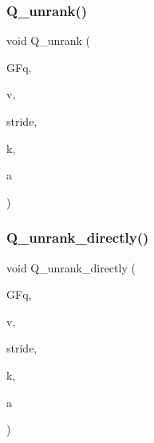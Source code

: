 \subsubsection{\texorpdfstring{Q\+\_\+unrank()}{Q\_unrank()}}
{\footnotesize\ttfamily void Q\+\_\+unrank (\begin{DoxyParamCaption}\item[{\mbox{\hyperlink{classfinite__field}{finite\+\_\+field}} \&}]{G\+Fq,  }\item[{\mbox{\hyperlink{galois_8h_a09fddde158a3a20bd2dcadb609de11dc}{I\+NT}} $\ast$}]{v,  }\item[{\mbox{\hyperlink{galois_8h_a09fddde158a3a20bd2dcadb609de11dc}{I\+NT}}}]{stride,  }\item[{\mbox{\hyperlink{galois_8h_a09fddde158a3a20bd2dcadb609de11dc}{I\+NT}}}]{k,  }\item[{\mbox{\hyperlink{galois_8h_a09fddde158a3a20bd2dcadb609de11dc}{I\+NT}}}]{a }\end{DoxyParamCaption})}

\mbox{\label{_l_i_b_2_g_a_l_o_i_s_2orthogonal__points_8_c_a105e7e72249e78fcf0785c69099d90ce}} 
\subsubsection{\texorpdfstring{Q\+\_\+unrank\+\_\+directly()}{Q\_unrank\_directly()}}
{\footnotesize\ttfamily void Q\+\_\+unrank\+\_\+directly (\begin{DoxyParamCaption}\item[{\mbox{\hyperlink{classfinite__field}{finite\+\_\+field}} \&}]{G\+Fq,  }\item[{\mbox{\hyperlink{galois_8h_a09fddde158a3a20bd2dcadb609de11dc}{I\+NT}} $\ast$}]{v,  }\item[{\mbox{\hyperlink{galois_8h_a09fddde158a3a20bd2dcadb609de11dc}{I\+NT}}}]{stride,  }\item[{\mbox{\hyperlink{galois_8h_a09fddde158a3a20bd2dcadb609de11dc}{I\+NT}}}]{k,  }\item[{\mbox{\hyperlink{galois_8h_a09fddde158a3a20bd2dcadb609de11dc}{I\+NT}}}]{a }\end{DoxyParamCaption})}

